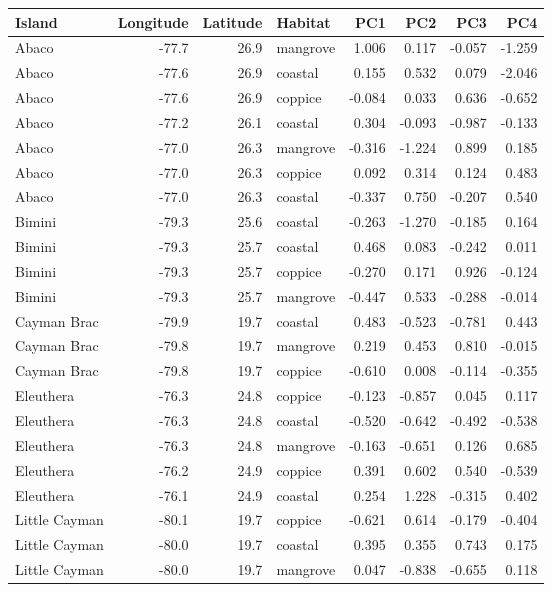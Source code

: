 
\begin{tabular}{lrrlrrrr}
\toprule
Island & Longitude & Latitude & Habitat & PC1 & PC2 & PC3 & PC4\\
\midrule
Abaco & -77.7 & 26.9 & mangrove & 1.006 & 0.117 & -0.057 & -1.259\\
Abaco & -77.6 & 26.9 & coastal & 0.155 & 0.532 & 0.079 & -2.046\\
Abaco & -77.6 & 26.9 & coppice & -0.084 & 0.033 & 0.636 & -0.652\\
Abaco & -77.2 & 26.1 & coastal & 0.304 & -0.093 & -0.987 & -0.133\\
Abaco & -77.0 & 26.3 & mangrove & -0.316 & -1.224 & 0.899 & 0.185\\
Abaco & -77.0 & 26.3 & coppice & 0.092 & 0.314 & 0.124 & 0.483\\
Abaco & -77.0 & 26.3 & coastal & -0.337 & 0.750 & -0.207 & 0.540\\
Bimini & -79.3 & 25.6 & coastal & -0.263 & -1.270 & -0.185 & 0.164\\
Bimini & -79.3 & 25.7 & coastal & 0.468 & 0.083 & -0.242 & 0.011\\
Bimini & -79.3 & 25.7 & coppice & -0.270 & 0.171 & 0.926 & -0.124\\
Bimini & -79.3 & 25.7 & mangrove & -0.447 & 0.533 & -0.288 & -0.014\\
Cayman Brac & -79.9 & 19.7 & coastal & 0.483 & -0.523 & -0.781 & 0.443\\
Cayman Brac & -79.8 & 19.7 & mangrove & 0.219 & 0.453 & 0.810 & -0.015\\
Cayman Brac & -79.8 & 19.7 & coppice & -0.610 & 0.008 & -0.114 & -0.355\\
Eleuthera & -76.3 & 24.8 & coppice & -0.123 & -0.857 & 0.045 & 0.117\\
Eleuthera & -76.3 & 24.8 & coastal & -0.520 & -0.642 & -0.492 & -0.538\\
Eleuthera & -76.3 & 24.8 & mangrove & -0.163 & -0.651 & 0.126 & 0.685\\
Eleuthera & -76.2 & 24.9 & coppice & 0.391 & 0.602 & 0.540 & -0.539\\
Eleuthera & -76.1 & 24.9 & coastal & 0.254 & 1.228 & -0.315 & 0.402\\
Little Cayman & -80.1 & 19.7 & coppice & -0.621 & 0.614 & -0.179 & -0.404\\
Little Cayman & -80.0 & 19.7 & coastal & 0.395 & 0.355 & 0.743 & 0.175\\
Little Cayman & -80.0 & 19.7 & mangrove & 0.047 & -0.838 & -0.655 & 0.118\\

\end{tabular}
